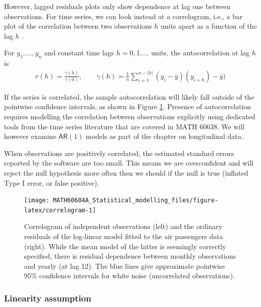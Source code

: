 \documentclass[
  11pt,
  letterpaper,
]{book}
\theoremstyle{definition}
\theoremstyle{definition}
\theoremstyle{definition}
\theoremstyle{definition}
\theoremstyle{remark}
\begin{document}
However, lagged residuals plots only show dependence at lag one between observations. For time series, we can look instead at a correlogram, i.e., a bar plot of the correlation between two observations \(h\) units apart as a function of the lag \(h\) \citep[Definition 1.4.4]{Brockwell/Davis:2016}.

For \(y_1, \ldots, y_n\) and constant time lags \(h=0, 1, \ldots\) units, the autocorrelation at lag \(h\) is
\begin{align*}
r(h) = \frac{\gamma(h)}{\gamma(0)}, \qquad \gamma(h) = \frac{1}{n}\sum_{i=1}^{n-|h|} (y_i-\overline{y})(y_{i+h}) - \overline{y})
\end{align*}

If the series is correlated, the sample autocorrelation will likely fall outside of the pointwise confidence intervals, as shown in Figure \ref{fig:correlogram}. Presence of autocorrelation requires modelling the correlation between observations explicitly using dedicated tools from the time series literature that are covered in MATH 60638. We will however examine \(\mathsf{AR}(1)\) models as part of the chapter on longitudinal data.

When observations are positively correlated, the estimated standard errors reported by the software are too small. This means we are overconfident and will reject the null hypothesis more often then we should if the null is true (inflated Type I error, or false positive).

\begin{figure}

{\centering \texttt{[image: MATH60604A\_Statistical\_modelling\_files/figure-latex/correlogram-1]} 

}

\caption{Correlogram of independent observations (left) and the ordinary residuals of the log-linear model fitted to the air passengers data (right). While the mean model of the latter is seemingly correctly specified, there is residual dependence between monthly observations and yearly (at lag 12). The blue lines give approximate pointwise 95\% confidence intervals for white noise (uncorrelated observations).}\label{fig:correlogram}
\end{figure}

\hypertarget{linearity-assumption}{%
\subsubsection{Linearity assumption}\label{linearity-assumption}}
\end{document}
